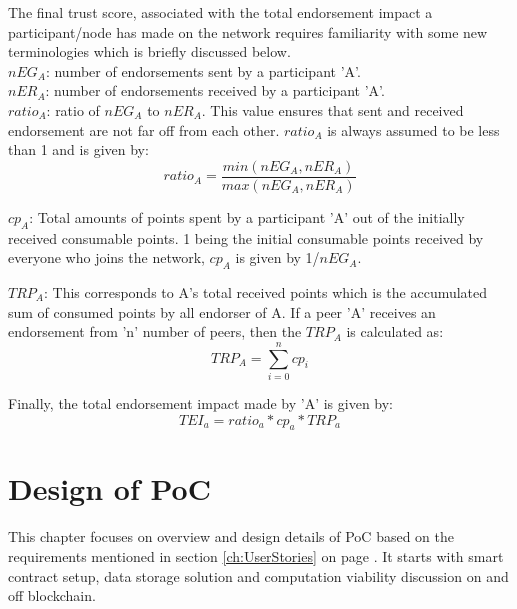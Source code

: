 The final trust score, associated with the total endorsement impact a
participant/node has made on the network requires familiarity with some new
terminologies which is briefly discussed below. \\

\textit{$nEG_A$}: number of endorsements sent by a participant 'A'. \\

\textit{$nER_A$}: number of endorsements received by a participant 'A'. \\

\textit{$ratio_A$}: ratio of \textit{$nEG_A$} to \textit{$nER_A$}. This value
ensures that sent and received endorsement are not far off from  each other.
\textit{$ratio_A$} is always assumed to be less than 1 and is given by: 
\begin{equation}
	ratio_A = \frac{min(nEG_A,nER_A)}{max(nEG_A,nER_A)} 
\end{equation}

\textit{$cp_A$}: Total amounts of points spent by a participant 'A' out of the
initially received consumable points. 1 being the initial consumable points
received by everyone who joins the network, \textit{$cp_A$} is given by
1/\textit{$nEG_A$}.

\textit{$TRP_A$}: This corresponds to A's total received points which is the
accumulated sum of consumed points by all endorser of A.  If a peer 'A'
receives an endorsement from 'n' number of peers, then the \textit{$TRP_A$} is
calculated as:
\begin{equation}
	TRP_A  = \sum_{i=0}^{n}cp_{i}
\end{equation}

Finally, the total endorsement impact made by 'A' is given by: \\
\begin{equation}
	TEI_a = ratio_a * cp_a * TRP_a
\end{equation}

%

\section{Design of PoC}
This chapter focuses on overview and design details of PoC based on the
requirements mentioned in section \ref{ch:UserStories} on page
\pageref{ch:UserStories}. It starts with smart contract setup, data storage
solution and computation viability discussion on and off blockchain. 

